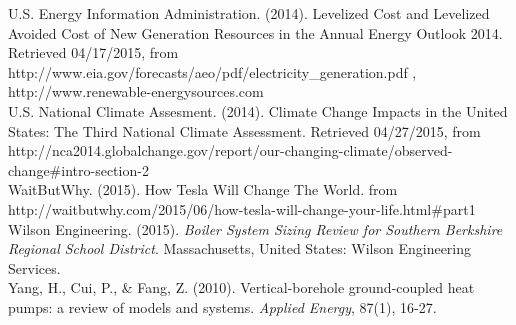 \hangindent=0.5in
U.S. Energy Information Administration. (2014). Levelized Cost and Levelized Avoided Cost of New Generation Resources in the Annual Energy Outlook 2014. Retrieved 04\slash 17\slash 2015, from http:\slash \slash www.eia.gov\slash forecasts\slash aeo\slash pdf\slash electricity\_generation.pdf , http:\slash \slash www.renewable-energysources.com \\

\hangindent=0.5in
U.S. National Climate Assesment. (2014). Climate Change Impacts in the United States: The Third National Climate Assessment. Retrieved 04\slash 27\slash 2015, from http:\slash \slash nca2014.globalchange.gov\slash report\slash our-changing-climate\slash observed-change\#intro-section-2 \\

\hangindent=0.5in
WaitButWhy. (2015). How Tesla Will Change The World. from http:\slash \slash waitbutwhy.com\slash 2015\slash 06\slash how-tesla-will-change-your-life.html\#part1 \\

\hangindent=0.5in
Wilson Engineering. (2015). \emph{Boiler System Sizing Review for Southern Berkshire Regional School District}. Massachusetts, United States: Wilson Engineering Services. \\

\hangindent=0.5in
Yang, H., Cui, P., \& Fang, Z. (2010). Vertical-borehole ground-coupled heat pumps: a review of models and systems. \emph{Applied Energy}, 87(1), 16-27.

\setlength{\parindent}{0.25in}
